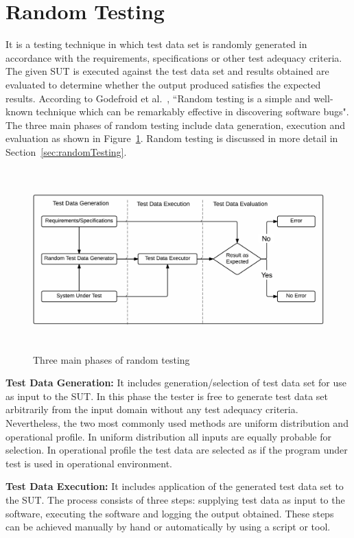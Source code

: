  

\section{Random Testing} 
It is a testing technique in which test data set is randomly generated in accordance with the requirements, specifications or other test adequacy criteria. The given SUT is executed against the test data set and results obtained are evaluated to determine whether the output produced satisfies the expected results. According to Godefroid et al.~\cite{godefroid2005dart}, ``Random testing is a simple and well-known technique which can be remarkably effective in discovering software bugs". The three main phases of random testing include data generation, execution and evaluation as shown in Figure~\ref{fig:SoftwareTesting1}. Random testing is discussed in more detail in Section~\ref{sec:randomTesting}.
\bigskip
\bigskip
\begin{figure}[H]
	\centering
		\includegraphics[width=15.3cm, height=7cm ]{chapter1/randomTestingPhases1.png}
		\caption{Three main phases of random testing}
	\label{fig:SoftwareTesting1}
\end{figure}
\bigskip
\textbf{Test Data Generation:} It includes generation/selection of test data set for use as input to the SUT. In this phase the tester is free to generate test data set arbitrarily from the input domain without any test adequacy criteria. Nevertheless, the two most commonly used methods are uniform distribution and operational profile. In uniform distribution all inputs are equally probable for selection. In operational profile the test data are selected as if the program under test is used in operational environment.

\textbf{Test Data Execution:} It includes application of the generated test data set to the SUT. The process consists of three steps: supplying test data as input to the software, executing the software and logging the output obtained. 
These steps can be achieved manually by hand or automatically by using a script or tool. 

